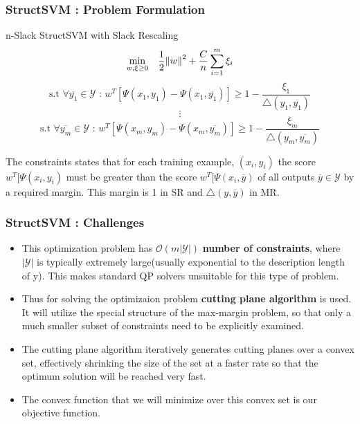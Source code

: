 \documentclass{beamer}
\begin{document}
\begin{frame}
\frametitle{StructSVM : Problem Formulation}
\begin{block}{n-Slack StructSVM with Slack Rescaling}
\[\underset{w, \xi \geq 0}{\min} \quad \frac{1}{2} \norm{w}^2 + \frac{C}{n} \sum_{i=1}^m \xi_i \]
\[ \textrm{s.t } \forall \overline{y_1} \in \mathcal{Y} \textrm{  :  } w^T[\Psi(x_1, y_1) - \Psi(x_1, \overline{y_1})] \geq 1 - \frac{\xi_1}{\bigtriangleup(y_1, \overline{y_1})} \]
\[ \vdots \]
\[ \textrm{s.t } \forall \overline{y_m} \in \mathcal{Y} \textrm{  :  } w^T[\Psi(x_m, y_m) - \Psi(x_m, \overline{y_m})] \geq 1 - \frac{\xi_m}{\bigtriangleup(y_m, \overline{y_m})} \]
\end{block}
The constraints states that for each training example, $(x_i, y_i)$ the score $w^T[\Psi(x_i, y_i)$ must be greater than the score $w^T[\Psi(x_i, \overline{y})$ of all outputs $\overline{y} \in \mathcal{Y}$ by a required margin. This margin is 1 in SR and $\bigtriangleup(y, \overline{y})$ in MR.
\end{frame}


\begin{frame}
\frametitle{StructSVM : Challenges}
\begin{itemize}
\item This optimization problem has $\mathcal{O}(m|\mathcal{Y}|)$ \textbf{number of constraints}, where $|\mathcal{Y}|$ is typically extremely large(usually exponential to the description length of y). This makes standard QP solvers unsuitable for this type of problem.

\item Thus for solving the optimizaion problem \textbf{cutting plane algorithm} is used. It will utilize the special structure of the max-margin problem, so that only a much smaller subset of constraints need to be explicitly examined.

\item The cutting plane algorithm iteratively generates cutting planes over a convex set, effectively shrinking the size of the set at a faster rate so that the optimum solution will be reached very fast.

\item The convex function that we will minimize over this convex set is our objective function.
\end{itemize}

\end{frame}
\end{document}
